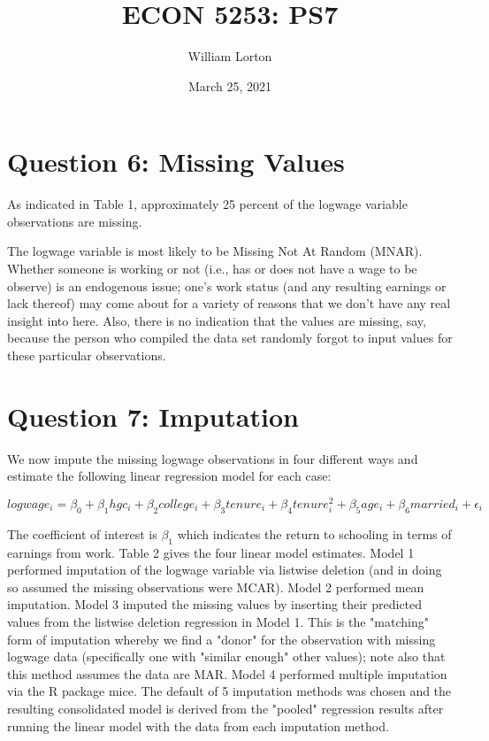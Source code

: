 \documentclass{article}
\title{ECON 5253: PS7}
\author{William Lorton}
\date{March 25, 2021}
\begin{document}
\maketitle

\section{Question 6: Missing Values}

As indicated in Table 1, approximately 25 percent of the logwage variable observations are missing.

\space

The logwage variable is most likely to be Missing Not At Random (MNAR). Whether someone is working or not (i.e., has or does not have a wage to be observe) is an endogenous issue; one's work status (and any resulting earnings or lack thereof) may come about for a variety of reasons that we don't have any real insight into here. Also, there is no indication that the values are missing, say, because the person who compiled the data set randomly forgot to input values for these particular observations.

\section{Question 7: Imputation}

We now impute the missing logwage observations in four different ways and estimate the following linear regression model for each case:

\space

\[logwage_i = \beta_0 + \beta_1hgc_i + \beta_2college_i + \beta_3tenure_i + \beta_4tenure^2_i + \beta_5age_i + \beta_6married_i + \epsilon_i\]

\space

The coefficient of interest is \(\beta_1\) which indicates the return to schooling in terms of earnings from work. Table 2 gives the four linear model estimates. Model 1 performed imputation of the logwage variable via listwise deletion (and in doing so assumed the missing observations were MCAR). Model 2 performed mean imputation. Model 3 imputed the missing values by inserting their predicted values from the listwise deletion regression in Model 1. This is the "matching" form of imputation whereby we find a "donor" for the observation with missing logwage data (specifically one with "similar enough" other values); note also that this method assumes the data are MAR. Model 4 performed multiple imputation via the R package mice. The default of 5 imputation methods was chosen and the resulting consolidated model is derived from the "pooled" regression results after running the linear model with the data from each imputation method.
\end{document}
